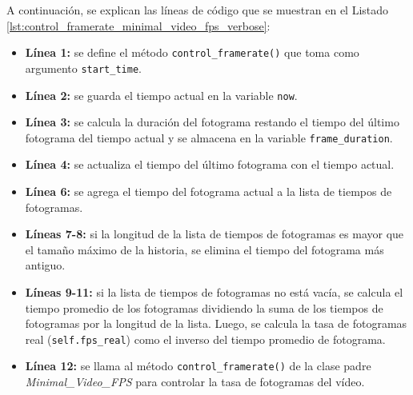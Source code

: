 A continuación, se explican las líneas de código que se muestran en el Listado \ref{lst:control_framerate_minimal_video_fps_verbose}:
\begin{itemize}
    \item \textbf{Línea 1:} se define el método \texttt{control\_framerate()} que toma como argumento \texttt{start\_time}.
    \item \textbf{Línea 2:} se guarda el tiempo actual en la variable \texttt{now}.
    \item \textbf{Línea 3:} se calcula la duración del fotograma restando el tiempo del último fotograma del tiempo actual y se almacena en la variable \texttt{frame\_duration}.
    \item \textbf{Línea 4:} se actualiza el tiempo del último fotograma con el tiempo actual.
    \item \textbf{Línea 6:} se agrega el tiempo del fotograma actual a la lista de tiempos de fotogramas.
    \item \textbf{Líneas 7-8:} si la longitud de la lista de tiempos de fotogramas es mayor que el tamaño máximo de la historia, se elimina el tiempo del fotograma más antiguo.
    \item \textbf{Líneas 9-11:} si la lista de tiempos de fotogramas no está vacía, se calcula el tiempo promedio de los fotogramas dividiendo la suma de los tiempos de fotogramas por la longitud de la lista. Luego, se calcula la tasa de fotogramas real (\texttt{self.fps\_real}) como el inverso del tiempo promedio de fotograma.
    \item \textbf{Línea 12:} se llama al método \texttt{control\_framerate()} de la clase padre \textit{Minimal\_Video\_FPS} para controlar la tasa de fotogramas del vídeo.
\end{itemize}
\vspace{\baselineskip}

